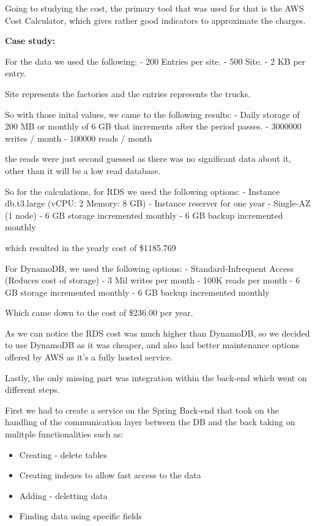 Going to studying the cost, the primary tool that was used for that is the AWS Cost Calculator, which gives rather good indicators to approximate the charges.

\textbf{Case study: }

For the data we used the following:
- 200 Entries per site.
- 500 Site.
- 2 KB per entry.

Site represents the factories and the entries represents the trucks.

So with those inital values, we came to the following results:
- Daily storage of 200 MB or monthly of 6 GB that increments after the period passes.
- 3000000 writes / month
- 100000 reads / month

the reads were just second guessed as there was no significant data about it, 
other than it will be a low read database.

So for the calculations, for RDS we used the following options:
- Instance db.t3.large (vCPU: 2 Memory: 8 GB)
- Instance reserver for one year 
- Single-AZ (1 node)
- 6 GB storage incremented monthly
- 6 GB backup incremented monthly

which resulted in the yearly cost of \$1185.769

For DynamoDB, we used the following options:
- Standard-Infrequent Access (Reduces cost of storage)
- 3 Mil writes per month
- 100K reads per month
- 6 GB storage incremented monthly
- 6 GB backup incremented monthly

Which came down to the cost of \$236.00 per year.

As we can notice the RDS cost was much higher than DynamoDB,
so we decided to use DynamoDB as it was cheaper, and also had
better maintenance options offered by AWS as it's a fully hosted
service.

Lastly, the only missing part was integration within the back-end which went on different steps.

First we had to create a service on the Spring Back-end that took on the handling of the communication layer between the DB and the back taking on mulitple functionalities such as:

    \begin{itemize}
        \item Creating - delete tables
        \item Creating indexes to allow fast access to the data
        \item Adding - deletting data
        \item Finding data using specific fields
    \end{itemize}

